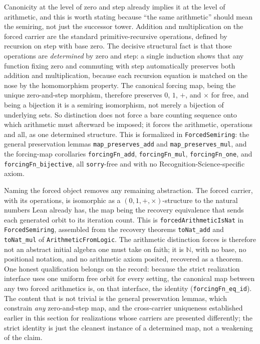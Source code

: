 \documentclass[11pt,a4paper]{article}
\theoremstyle{definition}
\theoremstyle{remark}
\begin{document}
Canonicity at the level of zero and step already implies it at the level of
arithmetic, and this is worth stating because ``the same arithmetic'' should mean
the semiring, not just the successor tower. Addition and multiplication on the
forced carrier are the standard primitive-recursive operations, defined by
recursion on step with base zero. The decisive structural fact is that those
operations are \emph{determined} by zero and step: a single induction shows that
any function fixing zero and commuting with step automatically preserves both
addition and multiplication, because each recursion equation is matched on the
nose by the homomorphism property. The canonical forcing map, being the unique
zero-and-step morphism, therefore preserves $0$, $1$, $+$, and $\times$ for free,
and being a bijection it is a semiring isomorphism, not merely a bijection of
underlying sets. So distinction does not force a bare counting sequence onto which
arithmetic must afterward be imposed; it forces the arithmetic, operations and
all, as one determined structure. This is formalized in \texttt{ForcedSemiring}:
the general preservation lemmas \texttt{map\_preserves\_add} and
\texttt{map\_preserves\_mul}, and the forcing-map corollaries
\texttt{forcingFn\_add}, \texttt{forcingFn\_mul}, \texttt{forcingFn\_one}, and
\texttt{forcingFn\_bijective}, all \texttt{sorry}-free and with no
Recognition-Science-specific axiom.

Naming the forced object removes any remaining abstraction. The forced carrier,
with its operations, is isomorphic as a $(0,1,+,\times)$-structure to the natural
numbers Lean already has, the map being the recovery equivalence that sends each
generated orbit to its iteration count. This is \texttt{forcedArithmeticIsNat} in
\texttt{ForcedSemiring}, assembled from the recovery theorems \texttt{toNat\_add}
and \texttt{toNat\_mul} of \texttt{ArithmeticFromLogic}. The arithmetic distinction
forces is therefore not an abstract initial algebra one must take on faith; it is
$\mathbb{N}$, with no base, no positional notation, and no arithmetic axiom
posited, recovered as a theorem. One honest qualification belongs on the record:
because the strict realization interface uses one uniform free orbit for every
setting, the canonical map between any two forced arithmetics is, on that
interface, the identity (\texttt{forcingFn\_eq\_id}). The content that is not
trivial is the general preservation lemmas, which constrain \emph{any} zero-and-step
map, and the cross-carrier uniqueness established earlier in this section for
realizations whose carriers are presented differently; the strict identity is just the cleanest
instance of a determined map, not a weakening of the claim.
\end{document}
